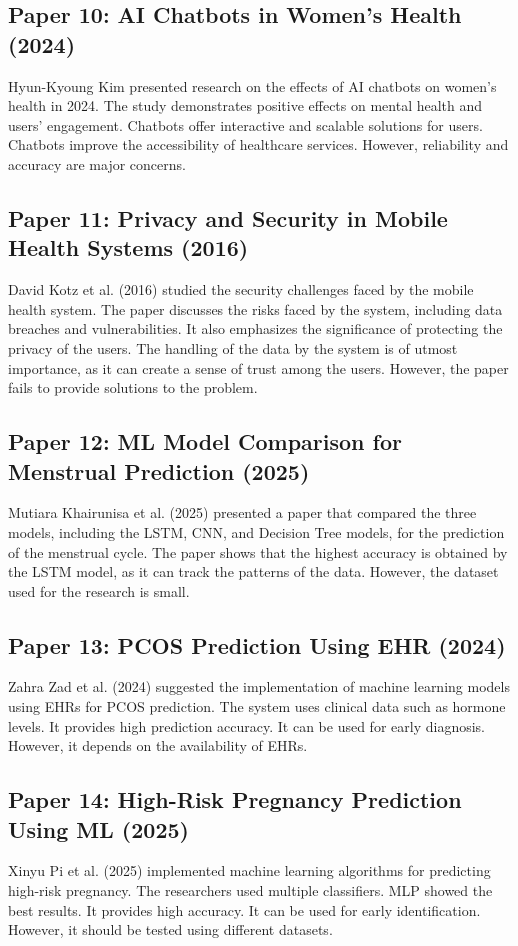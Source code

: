 \subsection{Paper 10: AI Chatbots in Women's Health (2024)}
Hyun-Kyoung Kim presented research on the effects of AI chatbots on women's health in 2024. The study demonstrates positive effects on mental health and users' engagement. Chatbots offer interactive and scalable solutions for users. Chatbots improve the accessibility of healthcare services. However, reliability and accuracy are major concerns. \cite{kim2024}

\subsection{Paper 11: Privacy and Security in Mobile Health Systems (2016)}
David Kotz et al. (2016) studied the security challenges faced by the mobile health system. The paper discusses the risks faced by the system, including data breaches and vulnerabilities. It also emphasizes the significance of protecting the privacy of the users. The handling of the data by the system is of utmost importance, as it can create a sense of trust among the users. However, the paper fails to provide solutions to the problem. \cite{kotz2016}

\subsection{Paper 12: ML Model Comparison for Menstrual Prediction (2025)}
Mutiara Khairunisa et al. (2025) presented a paper that compared the three models, including the LSTM, CNN, and Decision Tree models, for the prediction of the menstrual cycle. The paper shows that the highest accuracy is obtained by the LSTM model, as it can track the patterns of the data. However, the dataset used for the research is small. \cite{khairunisa2025,rego2023}

\subsection{Paper 13: PCOS Prediction Using EHR (2024)}
Zahra Zad et al. (2024) suggested the implementation of machine learning models using EHRs for PCOS prediction. The system uses clinical data such as hormone levels. It provides high prediction accuracy. It can be used for early diagnosis. However, it depends on the availability of EHRs. \cite{zad2024}

\subsection{Paper 14: High-Risk Pregnancy Prediction Using ML (2025)}
Xinyu Pi et al. (2025) implemented machine learning algorithms for predicting high-risk pregnancy. The researchers used multiple classifiers. MLP showed the best results. It provides high accuracy. It can be used for early identification. However, it should be tested using different datasets. \cite{pi2025}

